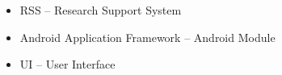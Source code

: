 \begin{itemize}
	\item RSS -- Research Support System
	\item Android Application Framework -- Android Module
	\item UI -- User Interface
\end{itemize}
